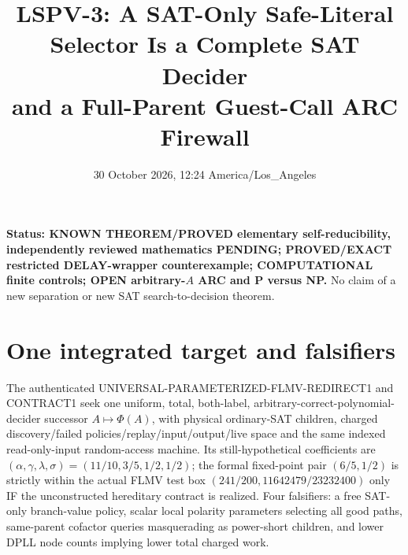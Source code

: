 \documentclass[11pt]{article}
\title{LSPV-3: A SAT-Only Safe-Literal Selector Is a Complete SAT Decider\\and a Full-Parent Guest-Call ARC Firewall}
\date{30 October 2026, 12:24 America/Los\_Angeles}
\begin{document}
\maketitle
\noindent\textbf{Status: KNOWN THEOREM/PROVED elementary self-reducibility, independently reviewed mathematics PENDING; PROVED/EXACT restricted DELAY-wrapper counterexample; COMPUTATIONAL finite controls; OPEN arbitrary-$A$ ARC and P versus NP.} No claim of a new separation or new SAT search-to-decision theorem.

\section{One integrated target and falsifiers}
The authenticated UNIVERSAL-PARAMETERIZED-FLMV-REDIRECT1 and CONTRACT1 seek one uniform, total, both-label, arbitrary-correct-polynomial-decider successor $A\mapsto\Phi(A)$, with physical ordinary-SAT children, charged discovery/failed policies/replay/input/output/live space and the same indexed read-only-input random-access machine. Its still-hypothetical coefficients are $(\alpha,\gamma,\lambda,\sigma)=(11/10,3/5,1/2,1/2)$; the formal fixed-point pair $(6/5,1/2)$ is strictly within the actual FLMV test box $(241/200,11642479/23232400)$ only IF the unconstructed hereditary contract is realized. Four falsifiers: a free SAT-only branch-value policy, scalar local polarity parameters selecting all good paths, same-parent cofactor queries masquerading as power-short children, and lower DPLL node counts implying lower total charged work.
\end{document}
